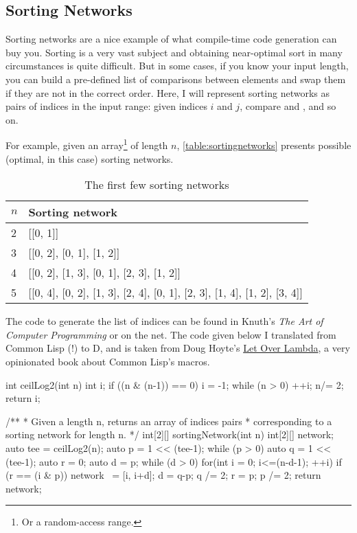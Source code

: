 \subsection{Sorting Networks}\label{sortingnetworks}

Sorting networks are a nice example of what compile-time code generation can buy you. Sorting is a very vast subject and obtaining near-optimal sort in many circumstances is quite difficult. But in some cases, if you know your input length, you can build a pre-defined list of comparisons between elements and swap them if they are not in the correct order. Here, I will represent sorting networks as pairs of indices in the input range: given indices $i$ and $j$, compare  and , and so on.

For example, given an array\footnote{ Or a random-access range.} of length $n$, \autoref{table:sortingnetworks} presents possible (optimal, in this case) sorting networks.

\begin{table}[htb]
\centering
\begin{tabular}[c]{|l|l|}
\hline
$n$ & Sorting network \\ \hline \hline
2   & [[0, 1]] \\ \hline
3   & [[0, 2], [0, 1], [1, 2]] \\ \hline
4   & [[0, 2], [1, 3], [0, 1], [2, 3], [1, 2]] \\ \hline
5   & [[0, 4], [0, 2], [1, 3], [2, 4], [0, 1], [2, 3], [1, 4], [1, 2], [3, 4]] \\ \hline
\end{tabular}
\caption{The first few sorting networks}
\label{table:sortingnetworks}
\end{table}

The code to generate the list of indices can be found in Knuth's \emph{The Art of Computer Programming} or on the net. The code given below I translated from Common Lisp (!) to D, and is taken from Doug Hoyte's \href{http://letoverlambda.com}{Let Over Lambda}, a very opinionated book about Common Lisp's macros.

\begin{dcode}
int ceilLog2(int n)
{
    int i;
    if ((n & (n-1)) == 0) i = -1;
    while (n > 0) { ++i; n/= 2;}
    return i;
}

/**
 * Given a length n, returns an array of indices pairs
 * corresponding to a sorting network for length n.
 */
int[2][] sortingNetwork(int n)
{
    int[2][] network;
    auto tee = ceilLog2(n);
    auto p = 1 << (tee-1);
    while (p > 0)
    {
        auto q = 1 << (tee-1);
        auto r = 0;
        auto d = p;
        while (d > 0)
        {
            for(int i = 0; i<=(n-d-1); ++i)
            {
                if (r == (i & p)) network ~= [i, i+d];
            }
            d = q-p;
            q /= 2;
            r = p;
        }
        p /= 2;
    }
    return network;
}
\end{dcode}

